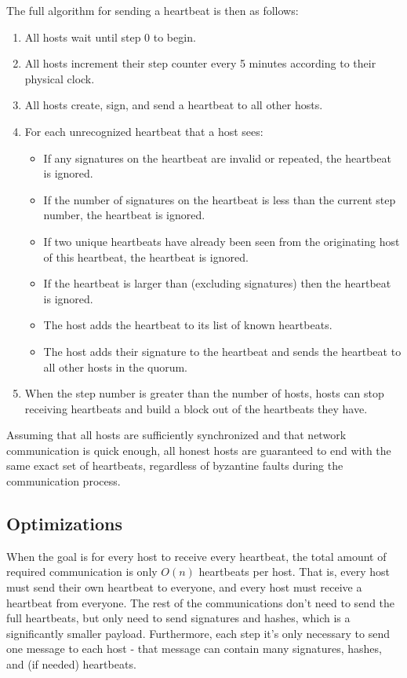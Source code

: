 \documentclass[twocolumn]{article}
\begin{document}
The full algorithm for sending a heartbeat is then as follows:
\begin{enumerate}
	\item All hosts wait until step 0 to begin.
	\item All hosts increment their step counter every 5 minutes according to their physical clock.
	\item All hosts create, sign, and send a heartbeat to all other hosts.
	\item For each unrecognized heartbeat that a host sees:
	\begin{itemize}
		\item If any signatures on the heartbeat are invalid or repeated, the heartbeat is ignored.
		\item If the number of signatures on the heartbeat is less than the current step number, the heartbeat is ignored.
		\item If two unique heartbeats have already been seen from the originating host of this heartbeat, the heartbeat is ignored.
		\item If the heartbeat is larger than \hbsize{} (excluding signatures) then the heartbeat is ignored.
		\item The host adds the heartbeat to its list of known heartbeats.
		\item The host adds their signature to the heartbeat and sends the heartbeat to all other hosts in the quorum.
	\end{itemize}
	\item When the step number is greater than the number of hosts, hosts can stop receiving heartbeats and build a block out of the heartbeats they have.
\end{enumerate}
Assuming that all hosts are sufficiently synchronized and that network communication is quick enough, all honest hosts are guaranteed to end with the same exact set of heartbeats, regardless of byzantine faults during the communication process.


\subsection{Optimizations}
When the goal is for every host to receive every heartbeat, the total amount of required communication is only $O(n)$ heartbeats per host.
That is, every host must send their own heartbeat to everyone, and every host must receive a heartbeat from everyone.
The rest of the communications don't need to send the full heartbeats, but only need to send signatures and hashes, which is a significantly smaller payload.
Furthermore, each step it's only necessary to send one message to each host - that message can contain many signatures, hashes, and (if needed) heartbeats.
\end{document}
